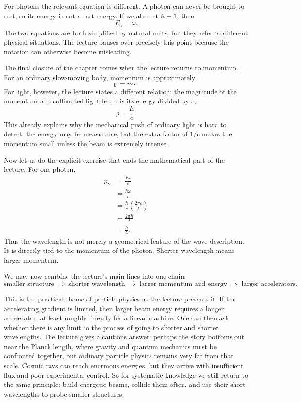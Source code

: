 For photons the relevant equation is different. A photon can never be brought to rest, so its energy is not a rest energy. If we also set \(\hbar=1\), then
\begin{equation}
E_\gamma = \omega.
\end{equation}
The two equations are both simplified by natural units, but they refer to different physical situations. The lecture pauses over precisely this point because the notation can otherwise become misleading.

The final closure of the chapter comes when the lecture returns to momentum. For an ordinary slow-moving body, momentum is approximately
\begin{equation}
\mathbf{p} = m\mathbf{v}.
\end{equation}
For light, however, the lecture states a different relation: the magnitude of the momentum of a collimated light beam is its energy divided by \(c\),
\begin{equation}
p = \frac{E}{c}.
\end{equation}
This already explains why the mechanical push of ordinary light is hard to detect: the energy may be measurable, but the extra factor of \(1/c\) makes the momentum small unless the beam is extremely intense.

Now let us do the explicit exercise that ends the mathematical part of the lecture. For one photon,
\begin{align}
p_\gamma &= \frac{E_\gamma}{c} \nonumber\\
&= \frac{\hbar\omega}{c} \nonumber\\
&= \frac{\hbar}{c}\left(\frac{2\pi c}{\lambda}\right) \nonumber\\
&= \frac{2\pi\hbar}{\lambda} \nonumber\\
&= \frac{h}{\lambda}.
\end{align}
Thus the wavelength is not merely a geometrical feature of the wave description. It is directly tied to the momentum of the photon. Shorter wavelength means larger momentum.

We may now combine the lecture's main lines into one chain:
\begin{equation}
\text{smaller structure}
\;\Longrightarrow\;
\text{shorter wavelength}
\;\Longrightarrow\;
\text{larger momentum and energy}
\;\Longrightarrow\;
\text{larger accelerators}.
\end{equation}

This is the practical theme of particle physics as the lecture presents it. If the accelerating gradient is limited, then larger beam energy requires a longer accelerator, at least roughly linearly for a linear machine. One can then ask whether there is any limit to the process of going to shorter and shorter wavelengths. The lecture gives a cautious answer: perhaps the story bottoms out near the Planck length, where gravity and quantum mechanics must be confronted together, but ordinary particle physics remains very far from that scale. Cosmic rays can reach enormous energies, but they arrive with insufficient flux and poor experimental control. So for systematic knowledge we still return to the same principle: build energetic beams, collide them often, and use their short wavelengths to probe smaller structures.

